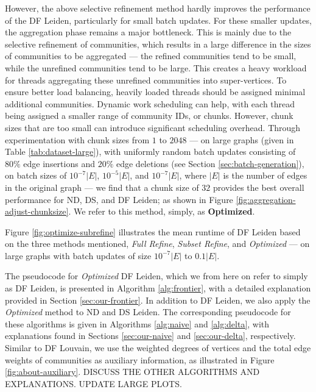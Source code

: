 However, the above selective refinement method hardly improves the performance of the DF Leiden, particularly for small batch updates. For these smaller updates, the aggregation phase remains a major bottleneck. This is mainly due to the selective refinement of communities, which results in a large difference in the sizes of communities to be aggregated --- the refined communities tend to be small, while the unrefined communities tend to be large. This creates a heavy workload for threads aggregating these unrefined communities into super-vertices. To ensure better load balancing, heavily loaded threads should be assigned minimal additional communities. Dynamic work scheduling can help, with each thread being assigned a smaller range of community IDs, or chunks. However, chunk sizes that are too small can introduce significant scheduling overhead. Through experimentation with chunk sizes from $1$ to $2048$ --- on large graphs (given in Table \ref{tab:dataset-large}), with uniformly random batch updates consisting of $80\%$ edge insertions and $20\%$ edge deletions (see Section \ref{sec:batch-generation}), on batch sizes of $10^{-7}|E|$, $10^{-5}|E|$, and $10^{-7}|E|$, where $|E|$ is the number of edges in the original graph --- we find that a chunk size of $32$ provides the best overall performance for ND, DS, and DF Leiden; as shown in Figure \ref{fig:aggregation-adjust-chunksize}. We refer to this method, simply, as \textbf{Optimized}.

Figure \ref{fig:optimize-subrefine} illustrates the mean runtime of DF Leiden based on the three methods mentioned, \textit{Full Refine}, \textit{Subset Refine}, and \textit{Optimized} --- on large graphs with batch updates of size $10^{-7}|E|$ to $0.1|E|$.

The pseudocode for \textit{Optimized} DF Leiden, which we from here on refer to simply as DF Leiden, is presented in Algorithm \ref{alg:frontier}, with a detailed explanation provided in Section \ref{sec:our-frontier}. In addition to DF Leiden, we also apply the \textit{Optimized} method to ND and DS Leiden. The corresponding pseudocode for these algorithms is given in Algorithms \ref{alg:naive} and \ref{alg:delta}, with explanations found in Sections \ref{sec:our-naive} and \ref{sec:our-delta}, respectively. Similar to DF Louvain, we use the weighted degrees of vertices and the total edge weights of communities as auxiliary information, as illustrated in Figure \ref{fig:about-auxiliary}.
DISCUSS THE OTHER ALGORITHMS AND EXPLANATIONS. UPDATE LARGE PLOTS.




